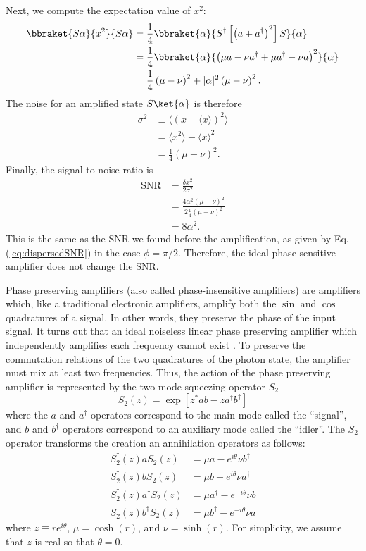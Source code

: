 Next, we compute the expectation value of $x^2$:
\begin{align}
\bbraket{S\alpha}{x^2}{S\alpha} &= \frac{1}{4}\bbraket{\alpha}{S^{\dagger}\left[ \left( a+a^{\dagger} \right)^2 \right] S}{\alpha} \\
&= \frac{1}{4} \bbraket{\alpha}{\left( \mu a-\nu a^{\dagger} + \mu a^{\dagger} - \nu a \right)^2}{\alpha} \\
&= \frac{1}{4} \left( \mu - \nu \right)^2 + |\alpha|^2 \left(\mu - \nu \right)^2 . \end{align}
The noise for an amplified state $S\ket{\alpha}$ is therefore \begin{align}
\sigma^2 &\equiv \langle(x - \langle x \rangle)^2 \rangle \\
&= \langle x^2 \rangle - \langle x \rangle^2 \\
&= \frac{1}{4}(\mu - \nu)^2 . \end{align}
Finally, the signal to noise ratio is \begin{align}
\text{SNR} &= \frac{\delta x^2}{2 \sigma^2} \\
&= \frac{4 \alpha^2 (\mu - \nu)^2}{2 \frac{1}{4} (\mu - \nu)^2} \\
&= 8 \alpha^2 . \end{align}
This is the same as the SNR we found before the amplification, as given by Eq.\,(\ref{eq:dispersedSNR}) in the case $\phi = \pi/2$.
Therefore, the ideal phase sensitive amplifier does not change the SNR.



Phase preserving amplifiers (also called phase-insensitive amplifiers) are amplifiers which, like a traditional electronic amplifiers, amplify both the $\sin$ and $\cos$ quadratures of a signal.
In other words, they preserve the phase of the input signal.
It turns out that an ideal noiseless linear phase preserving amplifier which independently amplifies each frequency cannot exist \cite{Caves:amplifiers1982}.
To preserve the commutation relations of the two quadratures of the photon state, the amplifier must mix at least two frequencies.
Thus, the action of the phase preserving amplifier is represented by the two-mode squeezing operator $S_2$
\begin{equation}
S_2(z) = \exp \left[ z^* a b - z a^\dagger b^\dagger \right] \end{equation}
where the $a$ and $a^{\dagger}$ operators correspond to the main mode called the ``signal'', and $b$ and $b^{\dagger}$ operators correspond to an auxiliary mode called the ``idler''.
The $S_2$ operator transforms the creation an annihilation operators as follows:
\begin{align}
S_2^\dagger(z) a S_2(z) &= \mu a - e^{i\theta} \nu b^\dagger \\
S_2^\dagger(z) b S_2(z) &= \mu b - e^{i\theta} \nu a^\dagger \\
S_2^\dagger(z) a^\dagger S_2(z) &= \mu a^\dagger - e^{-i\theta} \nu b \\
S_2^\dagger(z) b^\dagger S_2(z) &= \mu b^\dagger - e^{-i\theta} \nu a
\end{align}
where $z\equiv r e^{i \theta}$, $\mu = \cosh(r)$, and $\nu = \sinh(r)$.
For simplicity, we assume that $z$ is real so that $\theta=0$.

